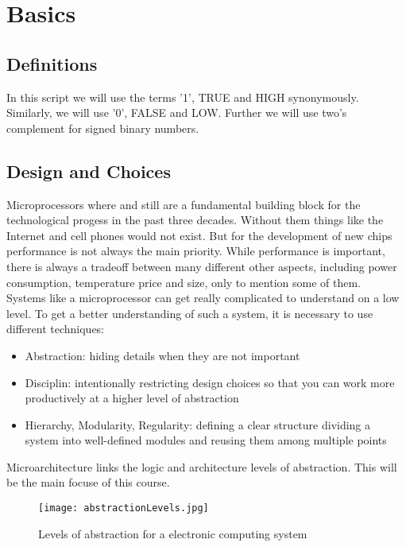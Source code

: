 \chapter{Basics}

\section{Definitions}

In this script we will use the terms '1', TRUE and HIGH synonymously. Similarly, we will use '0', FALSE and LOW. Further 
we will use two's complement for signed binary numbers.

\section{Design and Choices}

Microprocessors where and still are a fundamental building block for the technological progess in the past
three decades. Without them things like the Internet and cell phones would not exist. But for the
development of new chips performance is not always the main priority. While performance is important,
there is always a tradeoff between many different other aspects, including power consumption, temperature
price and size, only to mention some of them. \\

Systems like a microprocessor can get really complicated to understand on a low level. To get a better
understanding of such a system, it is necessary to use different techniques:
\begin{itemize}
    \item Abstraction: hiding details when they are not important
    \item Disciplin: intentionally restricting design choices so that you can work more productively at a higher level of abstraction
    \item Hierarchy, Modularity, Regularity: defining a clear structure dividing a system into well-defined modules and reusing them among multiple points
\end{itemize} 

Microarchitecture links the logic and architecture levels of abstraction. This will be the main focuse of this course.

\begin{figure}[h]
    \centering
    \texttt{[image: abstractionLevels.jpg]}
    \caption{Levels of abstraction for a electronic computing system}
\end{figure}

